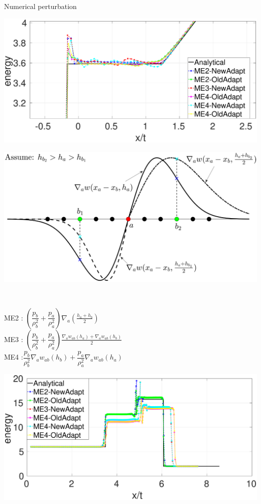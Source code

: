 \documentclass{beamer}
\begin{document}
\begin{frame}{Numerical perturbation}
\begin{minipage}{0.49 \textwidth}
\begin{minipage}{0.49\textwidth}
\end{minipage}
\begin{minipage}{0.48 \textwidth}
\includegraphics[width=0.99 \textwidth]{./Chapter-3/Figures/d-exp-NewAdpt-OldAdpt-e-zoom}
\end{minipage}
\end{minipage}
\begin{minipage}{0.49 \textwidth}
\includegraphics[width=0.99 \textwidth]{./Chapter-3/Figures/dw-ha}
\end{minipage}
\\
\begin{minipage}{0.55 \textwidth}
ME2 \footnotemark[5]: $\left(\dfrac{p_b}{\rho_b^2}+\dfrac{p_a}{\rho_a^2}\right)\nabla_a \left(\frac{h_a+h_b}{2}\right)$\\
ME3 \footnotemark[6]: $\left(\dfrac{p_b}{\rho_b^2}+\dfrac{p_a}{\rho_a^2}\right)\frac{\nabla_a w_{ab}(h_a)+ \nabla_a w_{ab}(h_b)}{2}$ \\
ME4 \footnotemark[7]:$\dfrac{p_b}{\rho_b^2} \nabla_a w_{a b}(h_b) + \dfrac{p_a}{\rho_a^2} \nabla_a w_{a b}(h_a)$
\end{minipage}
\begin{minipage}{0.42 \textwidth}
\includegraphics[width=0.99 \textwidth]{./Chapter-3/Figures/d-shock-NewAdpt-OldAdpt-e}

\end{minipage}
\end{frame}
\end{document}
